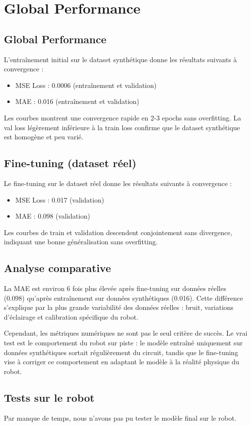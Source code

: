 \section{Global Performance}
\subsection{Global Performance}
L'entraînement initial sur le dataset synthétique donne les résultats suivants à convergence : 
\begin{itemize}
    \item MSE Loss : 0.0006 (entraînement et validation)
    \item MAE : 0.016 (entraînement et validation)
\end{itemize}
Les courbes montrent une convergence rapide en 2-3 epochs sans overfitting. 
La val loss légèrement inférieure à la train loss confirme que le dataset 
synthétique est homogène et peu varié. \\

\subsection{Fine-tuning (dataset réel)}
Le fine-tuning sur le dataset réel donne les résultats suivants à convergence :
\begin{itemize}
    \item MSE Loss : 0.017 (validation)
    \item MAE : 0.098 (validation)
\end{itemize}
Les courbes de train et validation descendent conjointement sans divergence, 
indiquant une bonne généralisation sans overfitting. 

\subsection{Analyse comparative}
La MAE est environ 6 fois plus élevée après fine-tuning sur données réelles 
(0.098) qu'après entraînement sur données synthétiques (0.016). 
Cette différence s'explique par la plus grande variabilité des données réelles : 
bruit, variations d'éclairage et calibration spécifique du robot.

Cependant, les métriques numériques ne sont pas le seul critère de succès. 
Le vrai test est le comportement du robot sur piste : le modèle entraîné 
uniquement sur données synthétiques sortait régulièrement du circuit, 
tandis que le fine-tuning vise à corriger ce comportement en adaptant 
le modèle à la réalité physique du robot. \\

\subsection{Tests sur le robot}
Par manque de temps, nous n'avons pas pu tester le modèle final sur le robot.
